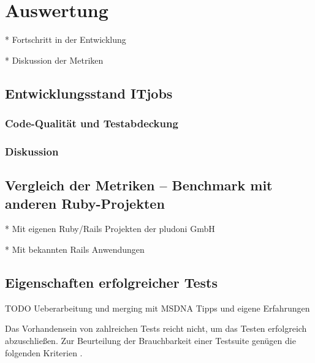 \section{Auswertung}

* Fortschritt in der Entwicklung

* Diskussion der Metriken
\subsection{Entwicklungsstand ITjobs}
\subsubsection{Code-Qualität und Testabdeckung}
\subsubsection{Diskussion}

\subsection{Vergleich der Metriken -- Benchmark mit anderen Ruby-Projekten}

* Mit eigenen Ruby/Rails Projekten der pludoni GmbH

* Mit bekannten Rails Anwendungen


\subsection{Eigenschaften erfolgreicher Tests}

TODO Ueberarbeitung und merging mit MSDNA Tipps und eigene Erfahrungen

Das Vorhandensein von zahlreichen Tests reicht nicht, um das Testen erfolgreich abzuschließen. Zur Beurteilung der Brauchbarkeit einer Testsuite genügen die folgenden Kriterien \cite[S.272-279]{rappin_rails_2011}.

